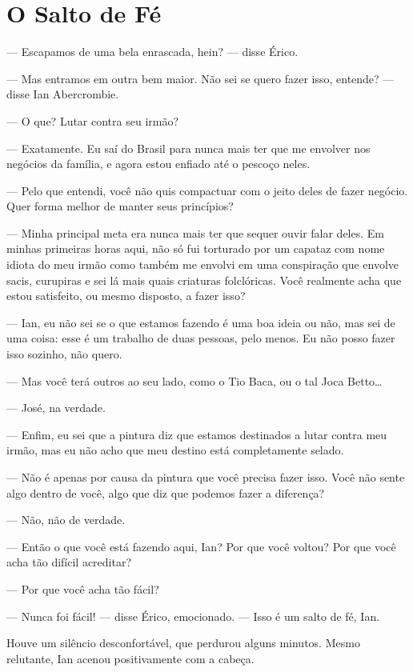 \chapter{O Salto de Fé}


--- Escapamos de uma bela enrascada, hein? --- disse Érico.

--- Mas entramos em outra bem maior. Não sei se quero fazer isso, entende? ---
disse Ian Abercrombie.

--- O que? Lutar contra seu irmão?

--- Exatamente. Eu saí do Brasil para nunca mais ter que me envolver nos
negócios da família, e agora estou enfiado até o pescoço neles.

--- Pelo que entendi, você não quis compactuar com o jeito deles de fazer
negócio. Quer forma melhor de manter seus princípios?

--- Minha principal meta era nunca mais ter que sequer ouvir falar deles. Em
minhas primeiras horas aqui, não só fui torturado por um capataz com nome
idiota do meu irmão como também me envolvi em uma conspiração que envolve
sacis, curupiras e sei lá mais quais criaturas folclóricas. Você realmente acha
que estou satisfeito, ou mesmo disposto, a fazer isso?

--- Ian, eu não sei se o que estamos fazendo é uma boa ideia ou não, mas sei de
uma coisa: esse é um trabalho de duas pessoas, pelo menos. Eu não posso fazer
isso sozinho, não quero.

--- Mas você terá outros ao seu lado, como o Tio Baca, ou o tal Joca
Betto\ldots

--- José, na verdade.

--- Enfim, eu sei que a pintura diz que estamos destinados a lutar contra meu
irmão, mas eu não acho que meu destino está completamente selado.

--- Não é apenas por causa da pintura que você precisa fazer isso. Você não
sente algo dentro de você, algo que diz que podemos fazer a diferença?

--- Não, não de verdade.

--- Então o que você está fazendo aqui, Ian? Por que você voltou? Por que você
acha tão difícil acreditar?

--- Por que você acha tão fácil?

--- Nunca foi fácil! --- disse Érico, emocionado. --- Isso é um salto de fé,
Ian.

Houve um silêncio desconfortável, que perdurou alguns minutos. Mesmo relutante,
Ian acenou positivamente com a cabeça.
